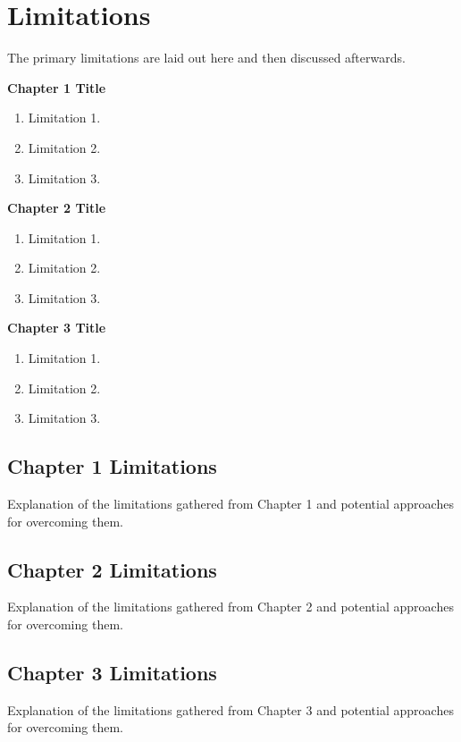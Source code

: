 \section{Limitations}
\label{sec:6-limitations}
\glsresetall

The primary limitations are laid out here and then discussed afterwards.

\begin{shaded*}
\textbf{Chapter 1 Title}
    \begin{enumerate}[wide, leftmargin=0.75cm, labelwidth=!, labelindent=0pt, label=\textbf{\Alph*}]
    \singlespacing
    \item Limitation 1.
    \item Limitation 2.
    \item Limitation 3.
    \end{enumerate}
\end{shaded*}
\begin{shaded*}
\textbf{Chapter 2 Title}
    \begin{enumerate}[wide, leftmargin=0.75cm, labelwidth=!, labelindent=0pt, label=\textbf{\Alph*}]
    \singlespacing
    \item Limitation 1.
    \item Limitation 2.
    \item Limitation 3.
    \end{enumerate}
\end{shaded*}
\begin{shaded*}
\textbf{Chapter 3 Title}
    \begin{enumerate}[wide, leftmargin=0.75cm, labelwidth=!, labelindent=0pt, label=\textbf{\Alph*}]
    \singlespacing
    \item Limitation 1.
    \item Limitation 2.
    \item Limitation 3.
    \end{enumerate}
\end{shaded*}

\subsection{Chapter 1 Limitations}

Explanation of the limitations gathered from Chapter 1 and potential approaches for overcoming them.

\subsection{Chapter 2 Limitations}

Explanation of the limitations gathered from Chapter 2 and potential approaches for overcoming them.

\subsection{Chapter 3 Limitations}

Explanation of the limitations gathered from Chapter 3 and potential approaches for overcoming them.
